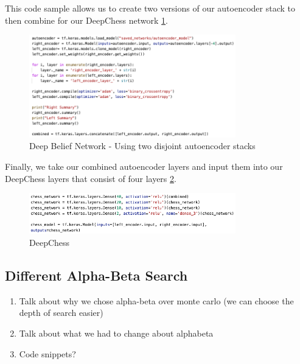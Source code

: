 \documentclass[12pt]{article}
\begin{document}
    This code sample allows us to create two versions of our autoencoder stack to then combine for our DeepChess network \ref{fig:dbn}.
    \begin{singlespace}
        \begin{figure}[ht]
            \centering
            \caption{Deep Belief Network - Using two disjoint autoencoder stacks}
            \label{fig:dbn}
            \includegraphics[width=0.8\textwidth]{dbn.png}
        \end{figure}
    \end{singlespace}

    Finally, we take our combined autoencoder layers and input them into our DeepChess layers that consist of four layers \ref{fig:deepchess}.
    \begin{singlespace}
        \begin{figure}[ht]
            \centering
            \caption{DeepChess}
            \label{fig:deepchess}
            \includegraphics[width=0.8\textwidth]{deepchess.png}
        \end{figure}
    \end{singlespace}

    \subsection{Different Alpha-Beta Search}

    \begin{enumerate}
        \item Talk about why we chose alpha-beta over monte carlo (we can choose the depth of search easier)
        \item Talk about what we had to change about alphabeta
        \item Code snippets?
    \end{enumerate}
    
\end{document}
